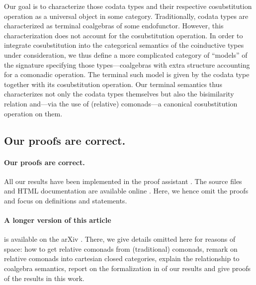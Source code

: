 \documentclass[a4paper,USenglish]{lipics}
\begin{document}
 Our goal is to characterize those codata types and their respective cosubstitution operation as a universal object in some category.
 Traditionally, codata types are characterized as terminal coalgebras of some endofunctor. However, this characterization does not account for 
 the cosubstitution operation.
 In order to integrate cosubstitution into the categorical semantics of the coinductive types under consideration,
 we thus define a more complicated category of \enquote{models} of the signature specifying those types---coalgebras with extra structure accounting for a 
 comonadic operation.
 The terminal such model is given by the codata type together with its cosubstitution operation.
 Our terminal semantics thus characterizes not only the codata types themselves but also the bisimilarity relation 
 and---via the use of (relative) comonads---a canonical cosubstitution operation on them.
 
 
\begin{Long} 
 \subsection{Our proofs are correct.}
\end{Long}
\begin{Short}
 \paragraph*{Our proofs are correct.}
\end{Short}

 
 All our results have been implemented in the proof assistant \coq \parencite{coq84pl4}.
 The \coq source files and HTML documentation are available online \parencite{trimat_coq}.
 Here, we hence omit the proofs and focus on definitions and statements.
 
\begin{Short}
\paragraph*{A longer version of this article} is available on the arXiv \parencite{trimat_coq}.
 There, we give details omitted here for reasons of space: 
  how to get relative comonads from (traditional) comonads, 
           remark on relative comonads into cartesian closed categories,
           explain the relationship to coalgebra semantics, report on the formalization in \coq of our results and
           give proofs of the results in this work.
\end{Short}
\end{document}
